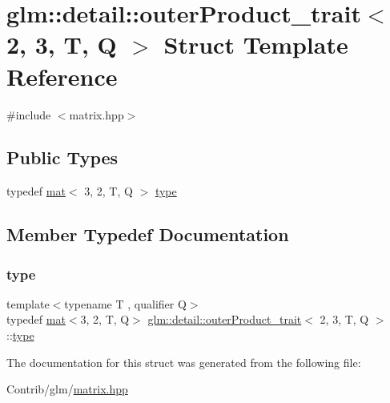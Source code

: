 \hypertarget{structglm_1_1detail_1_1outer_product__trait_3_012_00_013_00_01_t_00_01_q_01_4}{}\section{glm\+:\+:detail\+:\+:outer\+Product\+\_\+trait$<$ 2, 3, T, Q $>$ Struct Template Reference}
\label{structglm_1_1detail_1_1outer_product__trait_3_012_00_013_00_01_t_00_01_q_01_4}


{\ttfamily \#include $<$matrix.\+hpp$>$}

\subsection*{Public Types}
\begin{DoxyCompactItemize}
\item 
typedef \mbox{\hyperlink{structglm_1_1mat}{mat}}$<$ 3, 2, T, Q $>$ \mbox{\hyperlink{structglm_1_1detail_1_1outer_product__trait_3_012_00_013_00_01_t_00_01_q_01_4_aed11936b8908e00c2e53b98ab9dedd52}{type}}
\end{DoxyCompactItemize}


\subsection{Member Typedef Documentation}
\mbox{\label{structglm_1_1detail_1_1outer_product__trait_3_012_00_013_00_01_t_00_01_q_01_4_aed11936b8908e00c2e53b98ab9dedd52}} 
\subsubsection{\texorpdfstring{type}{type}}
{\footnotesize\ttfamily template$<$typename T , qualifier Q$>$ \\
typedef \mbox{\hyperlink{structglm_1_1mat}{mat}}$<$3, 2, T, Q$>$ \mbox{\hyperlink{structglm_1_1detail_1_1outer_product__trait}{glm\+::detail\+::outer\+Product\+\_\+trait}}$<$ 2, 3, T, Q $>$\+::\mbox{\hyperlink{structglm_1_1detail_1_1outer_product__trait_3_012_00_013_00_01_t_00_01_q_01_4_aed11936b8908e00c2e53b98ab9dedd52}{type}}}



The documentation for this struct was generated from the following file\+:\begin{DoxyCompactItemize}
\item 
Contrib/glm/\mbox{\hyperlink{matrix_8hpp}{matrix.\+hpp}}\end{DoxyCompactItemize}
